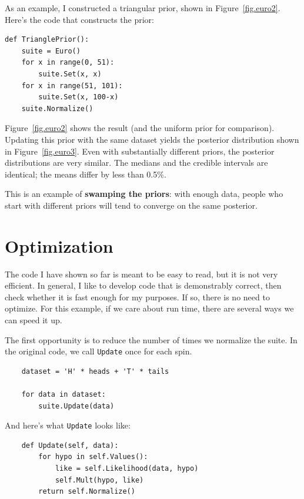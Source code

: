 \documentclass[12pt]{book}
\begin{document}
As an example, I constructed a triangular prior, shown in
Figure~\ref{fig.euro2}.  Here's the code that constructs the prior:

\begin{verbatim}
def TrianglePrior():
    suite = Euro()
    for x in range(0, 51):
        suite.Set(x, x)
    for x in range(51, 101):
        suite.Set(x, 100-x) 
    suite.Normalize()
\end{verbatim}

Figure~\ref{fig.euro2} shows the result (and the uniform prior for
comparison).
Updating this prior with the same dataset yields the posterior
distribution shown in Figure~\ref{fig.euro3}.  Even with substantially
different priors, the posterior distributions are very similar.  The
medians and the credible intervals are identical; the means differ by
less than 0.5\%.  

This is an example of {\bf swamping the priors}: with enough
data, people who start with different priors will tend to
converge on the same posterior.


\section{Optimization}

The code I have shown so far is meant to be easy to read, but it
is not very efficient.  In general, I like to develop code that
is demonstrably correct, then check whether it is fast enough for
my purposes.  If so, there is no need to optimize.
For this example, if we care about run time,
there are several ways we can speed it up.

The first opportunity is to reduce the number of times we
normalize the suite.
In the original code, we call \verb"Update" once for each spin.

\begin{verbatim}
    dataset = 'H' * heads + 'T' * tails

    for data in dataset:
        suite.Update(data)
\end{verbatim}

And here's what \verb"Update" looks like:

\begin{verbatim}
    def Update(self, data):
        for hypo in self.Values():
            like = self.Likelihood(data, hypo)
            self.Mult(hypo, like)
        return self.Normalize()
\end{verbatim}
\end{document}
